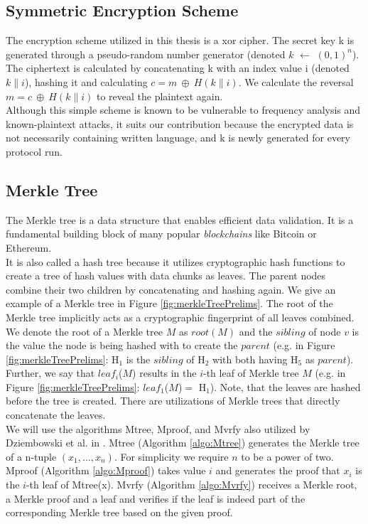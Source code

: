\documentclass{cacthesis}
\newcounter{protocol}
\begin{document}
            \subsection{Symmetric Encryption Scheme}
            \label{sub:SymmetricEncryptionScheme}
	        The encryption scheme utilized in this thesis is a xor cipher. The secret key k is generated through a pseudo-random number generator (denoted $k$ $\leftarrow$ $(0, 1)^n$). The ciphertext is calculated by concatenating k with an index value i (denoted $k\|i$), hashing it and calculating  $c = m \ \oplus \ H(k\|i)$. We calculate the reversal $m = c \ \oplus \ H(k\|i)$ to reveal the plaintext again. \\
            Although this simple scheme is known to be vulnerable to frequency analysis and known-plaintext attacks, it suits our contribution because the encrypted data is not necessarily containing written language, and k is newly generated for every protocol run.

            \subsection{Merkle Tree}
            \label{sub:MerkleTree}
	        The Merkle tree is a data structure that enables efficient data validation. It is a fundamental building block of many popular \textit{blockchains} like Bitcoin or Ethereum. \\
            It is also called a hash tree because it utilizes cryptographic hash functions to create a tree of hash values with data chunks as leaves. The parent nodes combine their two children by concatenating and hashing again. We give an example of a Merkle tree in Figure \ref{fig:merkleTreePrelims}. The root of the Merkle tree implicitly acts as a cryptographic fingerprint of all leaves combined. We denote the root of a Merkle tree $M$ as $root(M)$ and the $sibling$ of node $v$ is the value the node is being hashed with to create the $parent$ (e.g. in Figure \ref{fig:merkleTreePrelims}: H$_1$ is the $sibling$ of H$_2$ with both having H$_5$ as $parent$). Further, we say that $leaf_i$($M$) results in the $i$-th leaf of Merkle tree $M$ (e.g. in Figure \ref{fig:merkleTreePrelims}: $leaf_1$($M$)$=$ H$_1$). Note, that the leaves are hashed before the tree is created. There are utilizations of Merkle trees that directly concatenate the leaves. \\
            We will use the algorithms \textsf{Mtree}, \textsf{Mproof}, and \textsf{Mvrfy} also utilized by Dziembowski et al. in \cite{10.1145/3243734.3243857}. \textsf{Mtree} (Algorithm \ref{algo:Mtree}) generates the Merkle tree of a n-tuple $(x_1, ..., x_n)$. For simplicity we require $n$ to be a power of two. \textsf{Mproof} (Algorithm \ref{algo:Mproof}) takes value $i$ and generates the proof that $x_i$ is the $i$-th leaf of \textsf{Mtree(x)}. \textsf{Mvrfy} (Algorithm \ref{algo:Mvrfy}) receives a Merkle root, a Merkle proof and a leaf and verifies if the leaf is indeed part of the corresponding Merkle tree based on the given proof. 
            
\end{document}
